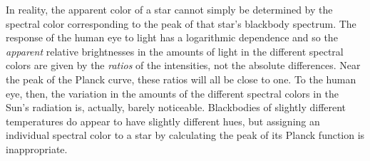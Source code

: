 \documentclass[12pt,aps,prb,preprint]{revtex4}   %
\begin{document}
In reality, the apparent color of a star cannot simply be determined by the spectral color corresponding to the peak of that star's blackbody spectrum.  
The response of the human eye to light has a logarithmic dependence and so the {\it apparent} relative brightnesses in the amounts of light in the different spectral colors are given by the {\it ratios} of the intensities, not the absolute differences.  Near the peak of the Planck curve, these ratios will all be close to one.  To the human eye, then, the variation in the amounts of the different spectral colors in the Sun's radiation is, actually, barely noticeable.  Blackbodies of slightly different temperatures do appear to have slightly different hues, but assigning an individual spectral color to a star by calculating the peak of its Planck function is inappropriate.
\end{document}
